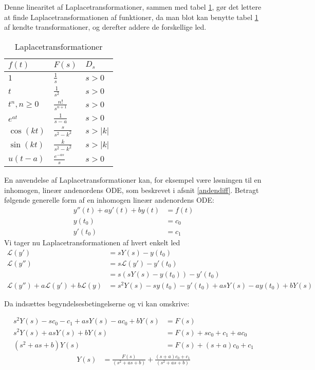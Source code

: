 Denne linearitet af Laplacetransformationer, sammen med tabel \ref{TableOne}, gør det lettere at finde Laplacetransformationen af funktioner, da man blot kan benytte tabel \ref{TableOne} af kendte transformationer, og derefter addere de forskellige led.
\hfill \break
\begin{table}[H]
\centering
\caption{Laplacetransformationer \citep[s. 271]{EP}}
\label{TableOne}
\begin{tabular}{|l|l|l|}
\hline
$f(t)$          & $F(s)$               & $D_s$     \\ \hline
$1$             & $\frac{1}{s}$        & $s > 0$   \\ \hline
$t$             & $\frac{1}{s^2}$      & $s > 0$   \\ \hline
$t^n, n \geq 0$ & $\frac{n!}{s^{n+1}}$ & $s > 0$   \\ \hline
$e^{at}$        & $\frac{1}{s-a}$      & $s > 0$   \\ \hline
$\cos(kt)$       & $\frac{s}{s^2-k^2}$  & $s > |k|$ \\ \hline
$\sin(kt)$       & $\frac{k}{s^2-k^2}$  & $s > |k|$ \\ \hline
$u(t-a)$        & $\frac{e^{-as}}{s}$  & $s > 0$   \\ \hline
\end{tabular}
\end{table} 
En anvendelse af Laplacetransformationer kan, for eksempel være løsningen til en inhomogen, lineær andenordens ODE, som beskrevet i afsnit \ref{andendiff}. Betragt følgende generelle form af en inhomogen lineær andenordens ODE: 
\begin{align*}
    y''(t) + ay'(t) + by(t) &= f(t)\\
    y(t_0) &= c_0\\
    y'(t_0) &= c_1
\end{align*}
Vi tager nu Laplacetransformationen af hvert enkelt led
\begin{align*}
    \mathcal{L}(y') &= sY(s) - y(t_0)\\
    \mathcal{L}(y'') &= s\mathcal{L}(y') - y'(t_0)\\
    &=s(sY(s) - y(t_0))- y'(t_0)\\
    \mathcal{L}(y'') + a\mathcal{L}(y') + b \mathcal{L}(y) &=s^2Y(s) - sy(t_0) - y'(t_0) + asY(s) - ay(t_0) + bY(s)
\end{align*}

Da indsættes begyndelsesbetingelserne og vi kan omskrive:

\begin{align*}
    s^2 Y(s) - sc_0 - c_1 + asY(s) - ac_0 + bY(s) &= F(s)\\
    s^2 Y(s) + asY(s) + bY(s) &= F(s) + sc_0 + c_1 + ac_0\\
    (s^2 + as + b)Y(s) &= F(s) + (s + a)c_0 + c_1
\end{align*}
\begin{align}\label{UbeKoefLap}
        Y(s) &= \frac{F(s)}{(s^2 + as + b)} + \frac{(s+a)c_0 + c_1}{(s^2 + as + b)}
\end{align}

